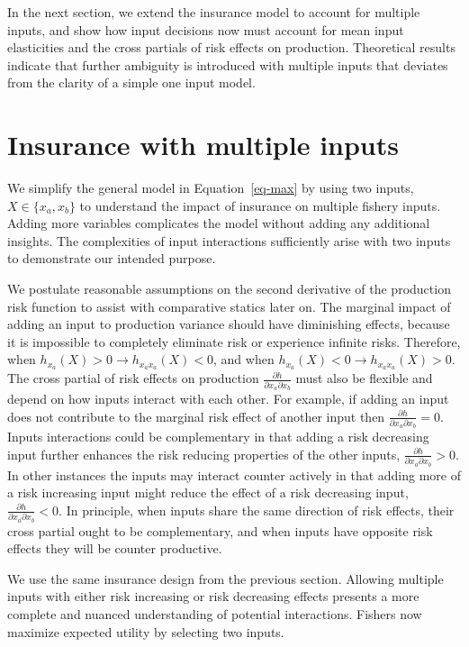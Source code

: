 \documentclass[
  letterpaper,
  DIV=11,
  numbers=noendperiod]{scrartcl}
\theoremstyle{plain}
\theoremstyle{plain}
\theoremstyle{remark}
\begin{document}
In the next section, we extend the insurance model to account for
multiple inputs, and show how input decisions now must account for mean
input elasticities and the cross partials of risk effects on production.
Theoretical results indicate that further ambiguity is introduced with
multiple inputs that deviates from the clarity of a simple one input
model.

\hypertarget{sec-multi}{%
\section{Insurance with multiple inputs}\label{sec-multi}}

We simplify the general model in Equation~\ref{eq-max} by using two
inputs, \(X\in\{{x_a,x_b}\}\) to understand the impact of insurance on
multiple fishery inputs. Adding more variables complicates the model
without adding any additional insights. The complexities of input
interactions sufficiently arise with two inputs to demonstrate our
intended purpose.

We postulate reasonable assumptions on the second derivative of the
production risk function to assist with comparative statics later on.
The marginal impact of adding an input to production variance should
have diminishing effects, because it is impossible to completely
eliminate risk or experience infinite risks. Therefore, when
\(h_{x_a}(X)>0 \rightarrow h_{x_ax_a}(X)<0\), and when
\(h_{x_a}(X)<0 \rightarrow h_{x_ax_a}(X)>0\). The cross partial of risk
effects on production \(\frac{\partial h}{\partial x_a \partial x_b}\)
must also be flexible and depend on how inputs interact with each other.
For example, if adding an input does not contribute to the marginal risk
effect of another input then
\(\frac{\partial h}{\partial x_a \partial x_b}=0\). Inputs interactions
could be complementary in that adding a risk decreasing input further
enhances the risk reducing properties of the other inputs,
\(\frac{\partial h}{\partial x_a \partial x_b}>0\). In other instances
the inputs may interact counter actively in that adding more of a risk
increasing input might reduce the effect of a risk decreasing input,
\(\frac{\partial h}{\partial x_a \partial x_b}<0\). In principle, when
inputs share the same direction of risk effects, their cross partial
ought to be complementary, and when inputs have opposite risk effects
they will be counter productive.

We use the same insurance design from the previous section. Allowing
multiple inputs with either risk increasing or risk decreasing effects
presents a more complete and nuanced understanding of potential
interactions. Fishers now maximize expected utility by selecting two
inputs.
\end{document}
